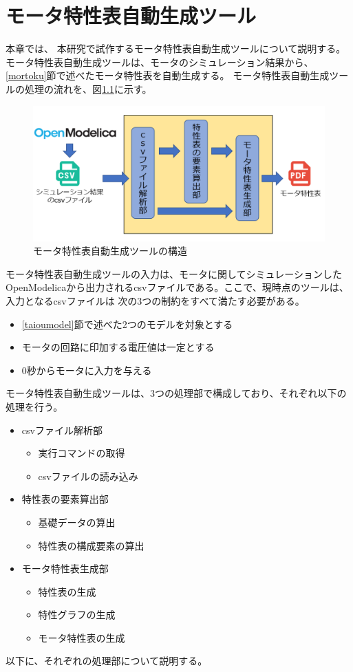 \chapter{モータ特性表自動生成ツール}\label{cha:Tool}
本章では、 本研究で試作するモータ特性表自動生成ツールについて説明する。
モータ特性表自動生成ツールは、モータのシミュレーション結果から、\ref{mortoku}節で述べたモータ特性表を自動生成する。
モータ特性表自動生成ツールの処理の流れを、図\ref{fig:kouzou}に示す。
\begin{figure}[t]
	\centering
	\includegraphics[width=14cm]{./Image/kouzou.png}
    \caption{モータ特性表自動生成ツールの構造}
	\label{fig:kouzou}
  \end{figure}
モータ特性表自動生成ツールの入力は、モータに関してシミュレーションしたOpenModelicaから出力されるcsvファイルである。ここで、現時点のツールは、入力となるcsvファイルは
次の3つの制約をすべて満たす必要がある。
\begin{itemize}
    \item \ref{taioumodel}節で述べた2つのモデルを対象とする
    \item モータの回路に印加する電圧値は一定とする
    \item 0秒からモータに入力を与える
\end{itemize}


モータ特性表自動生成ツールは、3つの処理部で構成しており、それぞれ以下の処理を行う。
\begin{itemize}
    \item csvファイル解析部
    \begin{itemize}
        \item 実行コマンドの取得
        \item csvファイルの読み込み
    \end{itemize}
    \item 特性表の要素算出部
    \begin{itemize}
        \item 基礎データの算出
        \item 特性表の構成要素の算出
    \end{itemize}
    \item モータ特性表生成部
    \begin{itemize}
        \item 特性表の生成
        \item 特性グラフの生成
        \item モータ特性表の生成
    \end{itemize}
\end{itemize}
以下に、それぞれの処理部について説明する。
